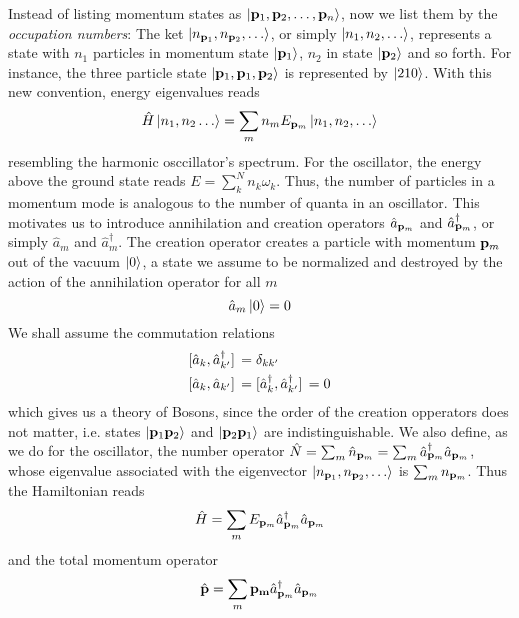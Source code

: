 Instead of listing momentum states as $\ket{\vb{p}_1,\vb{p}_2,\dots, \vb{p}_n}$, now we list them by the \textit{occupation numbers}: The ket $\ket{n_{\vb{p}_1},n_{\vb{p}_2},\dots}$, or simply $\ket{n_1,n_2,\dots}$, represents a state with $n_1$ particles in momentum state $\ket{\vb{p}_1}$, $n_2$ in state $\ket{\vb{p}_2}$ and so forth. For instance, the three particle state $\ket{\vb{p}_1,\vb{p}_1,\vb{p}_2}$ is represented by $\ket{210}$. With this new convention, energy eigenvalues reads
\begin{equation}
    \hat{H}\ket{n_1,n_2\dots}=\sum_mn_{m}E_{\vb{p}_m}\ket{n_1,n_2,\dots}
\end{equation}
resembling   the harmonic osccillator's spectrum. For the oscillator, the energy above the ground state reads $E=\sum_k^Nn_k\omega_k$. Thus, the number of particles in a momentum mode is analogous to the number of quanta in an oscillator.
This motivates us to introduce annihilation and creation operators $\hat{a}_{\vb{p}_m}$ and $\hat{a}^\dagger_{\vb{p}_m}$, or simply $\hat{a}_{m}$ and $\hat{a}^\dagger_{m}$. The creation operator creates a particle with momentum $\vb{p}_m$ out of the vacuum $\ket{0}$, a state we assume to be normalized and destroyed by the action of the annihilation operator for all $m$ 
\begin{equation}
    \hat{a}_{m}\ket{0}=0
\end{equation}
We shall assume the commutation relations
\begin{equation}
    \begin{aligned}
    \comm*{\hat{a}_k}{\hat{a}_{k^\prime}^\dagger}&=\delta_{kk^\prime} \\
    \comm*{\hat{a}_k}{\hat{a}_{k^\prime}}&=\comm*{\hat{a}_{k}^\dagger}{\hat{a}^\dagger_{k^\prime}}=0
    \end{aligned}
\end{equation}
which gives us a theory of Bosons, since the order of the creation opperators does not matter, i.e.  states $\ket{\vb{p}_1\vb{p}_2}$ and $\ket{\vb{p}_2\vb{p}_1}$ are indistinguishable.
 We also define, as we do for the oscillator, the number operator $\hat{N}=\sum_m\hat{n}_{\vb{p}_m}=\sum_m\hat{a}^\dagger_{\vb{p}_m}\hat{a}_{\vb{p}_m}$, whose eigenvalue associated with the eigenvector $\ket{n_{\vb{p}_1}, n_{\vb{p}_2},\dots}$ is $\sum_mn_{\vb{p}_m}$. Thus the Hamiltonian reads
\begin{equation}
    \hat{H}=\sum_mE_{\vb{p}_m}\hat{a}^\dagger_{\vb{p}_m}\hat{a}_{\vb{p}_m}
    \label{2nd_hamiltonian_discrete}
\end{equation}
and the total momentum operator 
\begin{equation}
    \hat{\vb{p}}=\sum_m \vb{p_m}\hat{a}^\dagger_{\vb{p}_m}\hat{a}_{\vb{p}_m}
    \label{2nd_momentum_discrete}
\end{equation}

